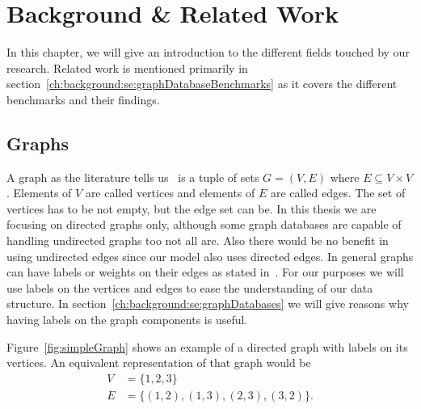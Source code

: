 \chapter{Background \& Related Work}
\label{ch:background}
In this chapter,
we will give an introduction to the different fields touched by our research.
Related work is mentioned primarily in section~\ref{ch:background:se:graphDatabaseBenchmarks} as it covers the different benchmarks and their findings.

\section{Graphs}
\label{ch:background:se:graphs}
A graph as the literature tells us~\cite[89]{Worsch2011} is a tuple of sets $ G = (V, E) $ where $ E \subseteq V \times V $.
Elements of $ V $ are called vertices and elements of $ E $ are called edges.
The set of vertices has to be not empty, but the edge set can be.
In this thesis we are focusing on directed graphs only,
although some graph databases are capable of handling undirected graphs too not all are.
Also there would be no benefit in using undirected edges since our model also uses directed edges.
In general graphs can have labels or weights on their edges as stated in~\cite[99]{Worsch2011}.
For our purposes we will use labels on the vertices and edges to ease the understanding of our data structure.
In section~\ref{ch:background:se:graphDatabases} we will give reasons why having labels on the graph components is useful.

Figure~\ref{fig:simpleGraph} shows an example of a directed graph with labels on its vertices.
An equivalent representation of that graph would be
\begin{equation}
  \begin{aligned}
    V &= \{1, 2, 3\} \\
    E &= \{(1, 2), (1, 3), (2, 3), (3, 2)\}.
  \end{aligned}
\end{equation}

